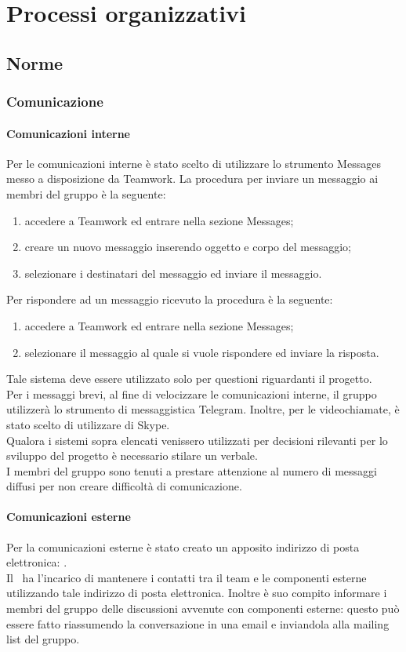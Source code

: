 \documentclass[../NormeProgetto.tex]{subfiles}
\begin{document}
\section{Processi organizzativi}
	\subsection{Norme}
		\subsubsection{Comunicazione}
			\paragraph{Comunicazioni interne}
			Per le comunicazioni interne è stato scelto di utilizzare lo strumento Messages messo a disposizione da Teamwork.
			La procedura per inviare un messaggio ai membri del gruppo è la seguente:
			\begin{enumerate}
				\item accedere a Teamwork ed entrare nella sezione Messages;
				\item creare un nuovo messaggio inserendo oggetto e corpo del messaggio;
				\item selezionare i destinatari del messaggio ed inviare il messaggio.
			\end{enumerate}
			Per rispondere ad un messaggio ricevuto la procedura è la seguente:
			\begin{enumerate}
				\item accedere a Teamwork ed entrare nella sezione Messages;
				\item selezionare il messaggio al quale si vuole rispondere ed inviare la risposta.
			\end{enumerate}
			 Tale sistema deve essere utilizzato solo per questioni riguardanti il progetto. \\
			Per i messaggi brevi, al fine di velocizzare le comunicazioni interne, il gruppo utilizzerà lo strumento di messaggistica Telegram. Inoltre, per le videochiamate, è stato scelto di utilizzare di Skype. \\
			Qualora i sistemi sopra elencati venissero utilizzati per decisioni rilevanti per lo sviluppo del progetto è necessario stilare un verbale.\\
			I membri del gruppo sono tenuti a prestare attenzione al numero di messaggi diffusi per non creare difficoltà di comunicazione. 
			\paragraph{Comunicazioni esterne}
			Per la comunicazioni esterne è stato creato un apposito indirizzo di posta elettronica: \mailleaf. \\
			Il \responsabilediprogetto\ ha l'incarico di mantenere i contatti tra il team e le componenti esterne utilizzando tale indirizzo di posta elettronica. Inoltre è suo compito informare i membri del gruppo delle discussioni avvenute con componenti esterne: questo può essere fatto riassumendo la conversazione in una email e inviandola alla mailing list del gruppo.
\end{document}
